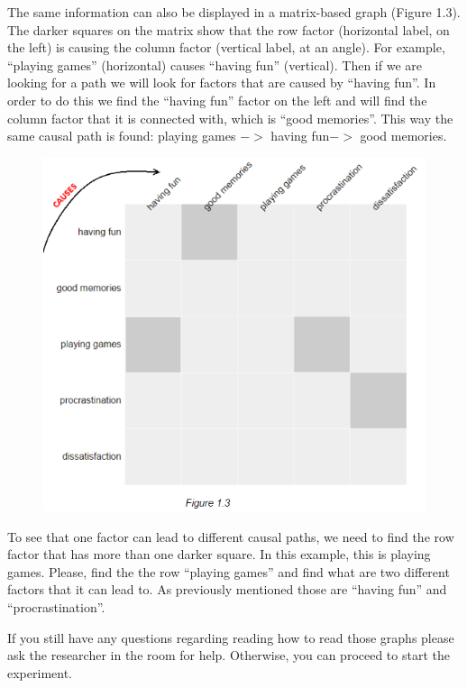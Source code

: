 \documentclass{l4proj}
\begin{document}
\begin{appendices}
The same information can also be displayed in a matrix-based graph (Figure 1.3). The darker
squares on the matrix show that the row factor (horizontal label, on the left) is causing the
column factor (vertical label, at an angle). For example, “playing games” (horizontal) causes
“having fun” (vertical). Then if we are looking for a path we will look for factors that are caused
by “having fun”. In order to do this we find the “having fun” factor on the left and will find the
column factor that it is connected with, which is “good memories”. This way the same causal
path is found: playing games $->$ having fun$ ->$ good memories.

\begin{figure}[H]
\centering
\includegraphics[width=13cm]{images/training13.PNG}
\caption{}
\label{training13}
\end{figure}

To see that one factor can lead to different causal paths, we need to find the row factor that has
more than one darker square. In this example, this is playing games. Please, find the the row
“playing games” and find what are two different factors that it can lead to. As previously
mentioned those are “having fun” and “procrastination”.

If you still have any questions regarding reading how to read those graphs please ask the
researcher in the room for help.
Otherwise, you can proceed to start the experiment.


\end{appendices}
\end{document}
